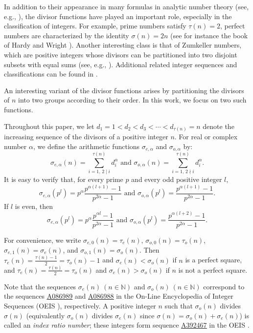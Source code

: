 \documentclass[12pt,reqno]{article}
\newcommand{\seqnum}[1]{\href{https://oeis.org/#1}{\underline{#1}}}
\begin{document}
In addition to their appearance in many formulas in analytic number theory (see, e.g., \cite{4}), the divisor functions have played an important role, especially in the classification of integers. For example, prime numbers satisfy $\tau(n) = 2$, perfect numbers are characterized by the identity $\sigma(n) = 2n$ (see for instance the book of Hardy and Wright \cite{2}). Another interesting class is that of Zumkeller numbers, which are positive integers whose divisors can be partitioned into two disjoint subsets with equal sums (see, e.g., \cite{3}). Additional related integer sequences and classifications can be found in \cite{4}.

An interesting variant of the divisor functions arises by partitioning the divisors of \(n\) into two groups according to their order. In this work, we focus on two such functions.

Throughout this paper, we let $d_1 = 1 < d_2 < d_3 < \cdots < d_{\tau(n)} = n$ denote the increasing sequence of the divisors of a positive integer $n$. For real or complex number $\alpha$, we define the arithmetic functions $\sigma_{e,\alpha}$ and $\sigma_{o,\alpha}$ by:
\begin{equation*}
\sigma_{e,\alpha}(n) = \sum_{i=1, \, 2 \mid i}^{\tau(n)} d_i^\alpha \text{ and }\sigma_{o,\alpha}(n) = \sum_{i=1, \, 2 \nmid i}^{\tau(n)} d_i^\alpha.
\end{equation*}
It is easy to verify that, for every prime \(p\) and every odd positive integer \(l\),
\begin{equation*}
\sigma_{e,\alpha}(p^l)=p^\alpha\dfrac{p^{\alpha(l+1)}-1}{p^{2\alpha}-1} \text{ and }\sigma_{o,\alpha}(p^l)=\dfrac{p^{\alpha(l+1)}-1}{p^{2\alpha}-1}.
\end{equation*}
If $l$ is even, then
\begin{equation*}
\sigma_{e,\alpha}(p^l)=p^\alpha\dfrac{p^{\alpha l}-1}{p^{2\alpha}-1} \text{ and }\sigma_{o,\alpha}(p^l)=\dfrac{p^{\alpha(l+2)}-1}{p^{2\alpha}-1}.
\end{equation*}

For convenience, we write
 $\sigma_{e,0}(n) = \tau_{e}(n)$, $\sigma_{o,0}(n) = \tau_{o}(n)$, $\sigma_{e,1}(n) = \sigma_{e}(n)$, and $\sigma_{o,1}(n) = \sigma_{o}(n)$. Then $\tau_{e}(n) = \frac{\tau(n) - 1}{2} = \tau_{o}(n) - 1$ and $\sigma_{e}(n) < \sigma_{o}(n)$ if $n$ is a perfect square, and $\tau_{e}(n) = \frac{\tau(n)}{2} = \tau_{o}(n)$ and $\sigma_{e}(n) > \sigma_{o}(n)$ if $n$ is not a perfect square.

Note that the sequences $\sigma_{e}(n)\ (n\in\mathbb{N})$ and $\sigma_{o}(n)\ (n\in\mathbb{N})$ correspond to the sequences \seqnum{A086989} and \seqnum{A086988} in the On-Line
Encyclopedia of Integer Sequences  (OEIS \cite{5}), respectively. A positive integer $n$ such that $\sigma_{o}(n)$ divides $\sigma(n)$ (equivalently $\sigma_{o}(n)$ divides $\sigma_{e}(n)$ since $\sigma(n)=\sigma_{o}(n)+\sigma_{e}(n)$) is called an \emph{index ratio number}; these integers form sequence \seqnum{A392467} in the OEIS \cite{5}.
\end{document}
